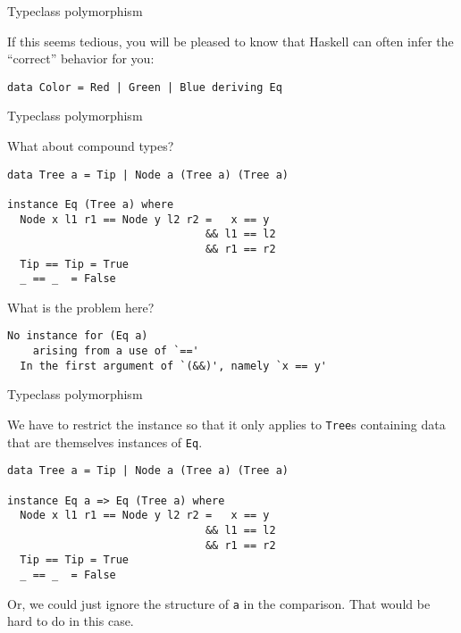 %
\begin{frame}[fragile]{Typeclass polymorphism}

If this seems tedious, you will be pleased to know that Haskell can often infer
the ``correct'' behavior for you:

\begin{block}{}
\begin{verbatim}
data Color = Red | Green | Blue deriving Eq
\end{verbatim}
\end{block}

\end{frame}

%
\begin{frame}[fragile]{Typeclass polymorphism}

What about compound types?

\begin{block}{}
\begin{verbatim}
data Tree a = Tip | Node a (Tree a) (Tree a)

instance Eq (Tree a) where
  Node x l1 r1 == Node y l2 r2 =   x == y 
                               && l1 == l2 
                               && r1 == r2
  Tip == Tip = True
  _ == _  = False
\end{verbatim}
\end{block}

What is the problem here?

\begin{block}{}
\begin{verbatim}
No instance for (Eq a)
    arising from a use of `=='
  In the first argument of `(&&)', namely `x == y'
\end{verbatim}
\end{block}

\end{frame}

%
\begin{frame}[fragile]{Typeclass polymorphism}

We have to restrict the instance so that it only applies to \texttt{Tree}s
containing data that are themselves instances of \texttt{Eq}.

\begin{block}{}
\begin{verbatim}
data Tree a = Tip | Node a (Tree a) (Tree a)

instance Eq a => Eq (Tree a) where
  Node x l1 r1 == Node y l2 r2 =   x == y 
                               && l1 == l2 
                               && r1 == r2
  Tip == Tip = True
  _ == _  = False
\end{verbatim}
\end{block}

Or, we could just ignore the structure of \texttt{a} in the comparison. That
would be hard to do in this case.

\end{frame}
